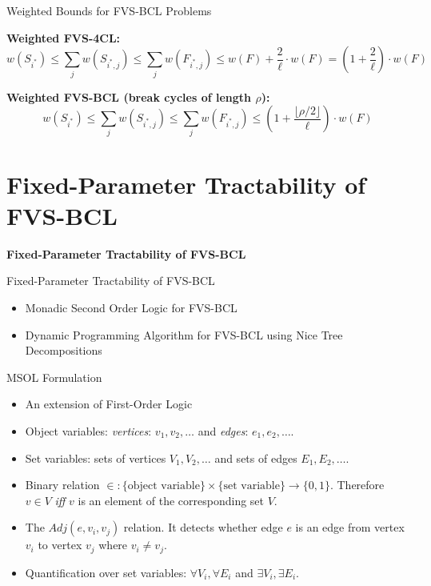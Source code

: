 \documentclass{beamer}
\begin{document}
\begin{frame}{Weighted Bounds for FVS-BCL Problems}

\textbf{Weighted FVS-4CL:}
\[
w(S_{i^*}) \leq \sum\limits_j w(S_{i^*, j}) \leq \sum\limits_j w(F_{i^*, j}) \leq w(F) + \frac{2}{\ell} \cdot w(F) = \left(1 + \frac{2}{\ell}\right) \cdot w(F)
\]

\vspace{1em}

\textbf{Weighted FVS-BCL (break cycles of length $\rho$):}
\[
w(S_{i^*}) \leq \sum\limits_j w(S_{i^*, j}) \leq \sum\limits_j w(F_{i^*, j}) \leq \left(1 + \frac{\lfloor\rho/2\rfloor}{\ell}\right) \cdot w(F)
\]

\end{frame}

\section{Fixed-Parameter Tractability of FVS-BCL}

\begin{frame}
  \centering
  \vfill
  \LARGE \textbf{Fixed-Parameter Tractability of FVS-BCL}
  \vfill
\end{frame}


\begin{frame}{Fixed-Parameter Tractability of FVS-BCL}
  \begin{itemize}
    \item Monadic Second Order Logic for FVS-BCL
    \item Dynamic Programming Algorithm for FVS-BCL using Nice Tree Decompositions
  \end{itemize}
\end{frame}

\begin{frame}{MSOL Formulation}
  \begin{itemize}
    \item An extension of First-Order Logic
    \item Object variables: \textit{vertices}: $v_1, v_2, \dots$ and \textit{edges}: $e_1, e_2, \dots$. 
    \item Set variables: sets of vertices $V_1, V_2, \dots$ and sets of edges $E_1, E_2, \dots$.
    \item Binary relation $\in : \{\text{object variable}\} \times \{\text{set variable}\} \to \{0, 1\}$. Therefore 
    $v \in V$ \textit{iff} $v$ is an element of the corresponding set $V$.
    \item The $Adj(e, v_i, v_j)$ relation. It detects whether edge $e$ is an edge from vertex $v_i$ to 
    vertex $v_j$ where $v_i \neq v_j$.
    \item Quantification over set variables: $\forall V_i, \forall E_i$ and $\exists V_i, \exists E_i$.
  \end{itemize}
\end{frame}
\end{document}
